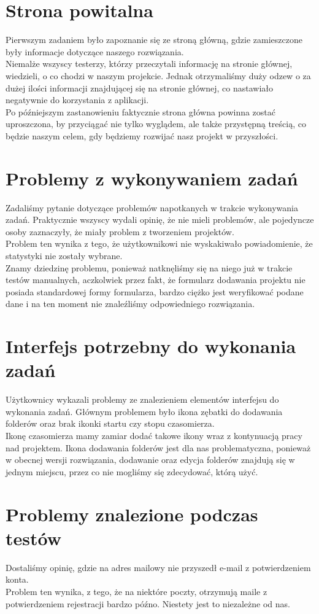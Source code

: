 \documentclass[a4paper,11pt]{report}
\begin{document}
\section{Strona powitalna}
Pierwszym zadaniem było zapoznanie się ze stroną główną, gdzie zamieszczone były informacje dotyczące naszego rozwiązania.\\
Niemalże wszyscy testerzy, którzy przeczytali informację na stronie głównej, wiedzieli, o co chodzi w naszym projekcie.
Jednak otrzymaliśmy duży odzew o za dużej ilości informacji znajdującej się na stronie głównej, co nastawiało negatywnie do korzystania z aplikacji.\\
Po późniejszym zastanowieniu faktycznie strona główna powinna zostać uproszczona, by przyciągać nie tylko wyglądem,
 ale także przystępną treścią, co będzie naszym celem, gdy będziemy rozwijać nasz projekt w przyszłości.
\section{Problemy z wykonywaniem zadań}
Zadaliśmy pytanie dotyczące problemów napotkanych w trakcie wykonywania zadań. Praktycznie wszyscy wydali opinię, że nie mieli problemów,
 ale pojedyncze osoby zaznaczyły, że miały problem z tworzeniem projektów.\\
Problem ten wynika z tego, że użytkownikowi nie wyskakiwało powiadomienie, że statystyki nie zostały wybrane.\\
Znamy dziedzinę problemu, ponieważ natknęliśmy się na niego już w trakcie testów manualnych,
 aczkolwiek przez fakt, że formularz dodawania projektu nie posiada standardowej formy formularza,
 bardzo ciężko jest weryfikować podane dane i na ten moment nie znaleźliśmy odpowiedniego rozwiązania.
\section{Interfejs potrzebny do wykonania zadań}
Użytkownicy wykazali problemy ze znalezieniem elementów interfejsu do wykonania zadań.
Głównym problemem było ikona zębatki do dodawania folderów oraz brak ikonki startu czy stopu czasomierza.\\
Ikonę czasomierza mamy zamiar dodać takowe ikony wraz z kontynuacją pracy nad projektem. 
Ikona dodawania folderów jest dla nas problematyczna, ponieważ w obecnej wersji rozwiązania,
 dodawanie oraz edycja folderów znajdują się w jednym miejscu, przez co nie mogliśmy się zdecydować, którą użyć.\\
\section{Problemy znalezione podczas testów}
Dostaliśmy opinię, gdzie na adres mailowy nie przyszedł e-mail z potwierdzeniem konta.\\
Problem ten wynika, z tego, że na niektóre poczty, otrzymują maile z potwierdzeniem rejestracji bardzo późno. 
Niestety jest to niezależne od nas.
\end{document}
